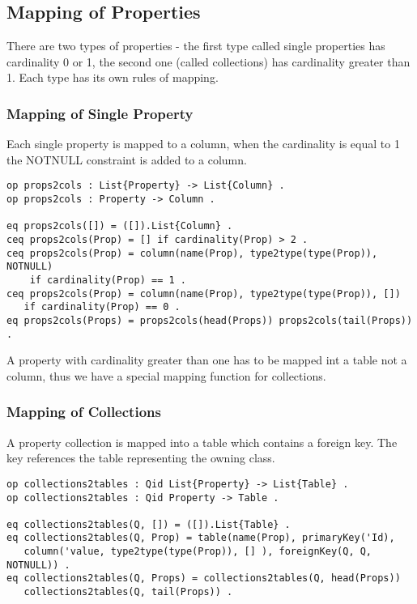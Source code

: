 \documentclass[11pt]{article}
\begin{document}
\subsection{Mapping of Properties}
There are two types of properties - the first type called single properties has cardinality 0 or 1, the second one (called collections) has cardinality greater than 1. Each type has its own rules of mapping.

\subsubsection{Mapping of Single Property}
Each single property is mapped to a column, when the cardinality is equal to 1 the NOTNULL constraint is added to a column. 
\begin{verbatim}
op props2cols : List{Property} -> List{Column} .
op props2cols : Property -> Column .

eq props2cols([]) = ([]).List{Column} .
ceq props2cols(Prop) = [] if cardinality(Prop) > 2 .
ceq props2cols(Prop) = column(name(Prop), type2type(type(Prop)), NOTNULL)
    if cardinality(Prop) == 1 .
ceq props2cols(Prop) = column(name(Prop), type2type(type(Prop)), []) 
   if cardinality(Prop) == 0 .
eq props2cols(Props) = props2cols(head(Props)) props2cols(tail(Props)) .
\end{verbatim}
A property with cardinality greater than one has to be mapped int a table not a column, thus we have a special mapping function for collections.

\subsubsection{Mapping of Collections}
A property collection is mapped into a table which contains a foreign key. The key references the table representing the owning class.
\begin{verbatim}
op collections2tables : Qid List{Property} -> List{Table} .
op collections2tables : Qid Property -> Table . 

eq collections2tables(Q, []) = ([]).List{Table} .
eq collections2tables(Q, Prop) = table(name(Prop), primaryKey('Id), 
   column('value, type2type(type(Prop)), [] ), foreignKey(Q, Q, NOTNULL)) .
eq collections2tables(Q, Props) = collections2tables(Q, head(Props)) 
   collections2tables(Q, tail(Props)) .
\end{verbatim}
\end{document}
